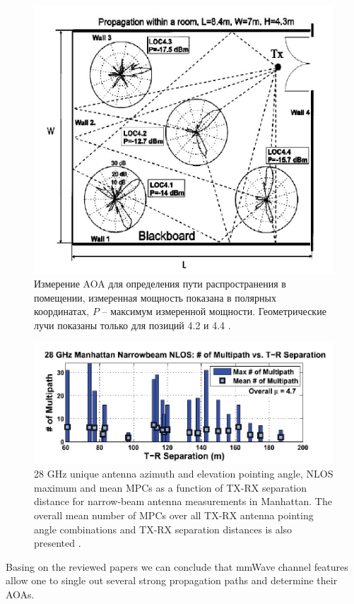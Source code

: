 \begin{figure}[h]
    \centering
    \includegraphics[width=0.8\linewidth]{figs/fig3.1}
    \caption{ Измерение AOA для определения пути распространения в помещении,
        измеренная мощность показана в полярных координатах, $P$ -- максимум
        измеренной мощности. Геометрические лучи показаны только для позиций
        4.2 и 4.4 \cite{Xu2002}.}
    \label{fig:3.1}
\end{figure}

\begin{figure}[h]
    \centering
    \includegraphics[width=0.8\linewidth]{figs/fig3.2}
    \caption{28 GHz unique antenna azimuth and elevation pointing angle, NLOS
        maximum and mean MPCs as a function of TX-RX separation distance for
        narrow-beam antenna measurements in Manhattan. The overall mean number
        of MPCs over all TX-RX antenna pointing angle combinations and TX-RX
    separation distances is also presented \cite{Rappaport2015}.}
    \label{fig:3.2}
\end{figure}
Basing on the reviewed papers we can conclude that mmWave channel features
allow one to single out several strong propagation paths and determine their
AOAs.

